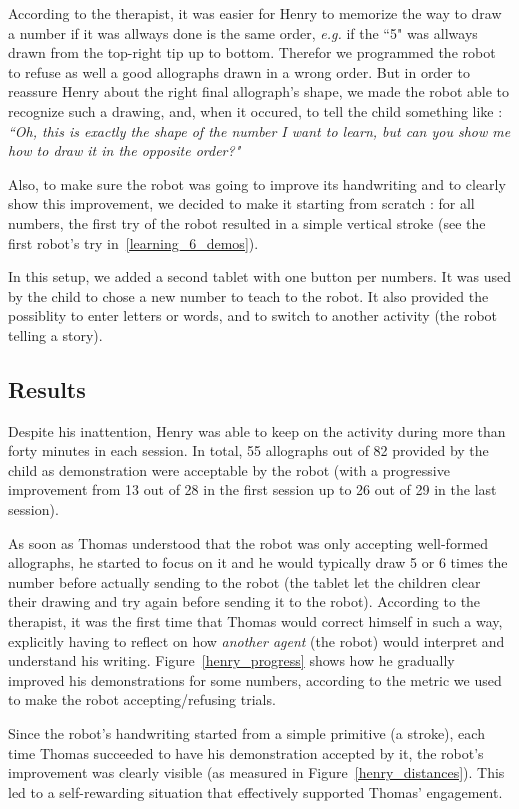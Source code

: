 \documentclass{sig-alternate}
\begin{document}
According to the therapist, it was easier for Henry to memorize the way to draw
a number if it was allways done is the same order, \emph{e.g.} if the ``5" was allways
drawn from the top-right tip up to bottom. Therefor we programmed the robot to
refuse as well a good allographs drawn in a wrong order. But in order to reassure Henry
about the right final allograph's shape, we made the robot able to recognize
such a drawing, and, when it occured, to tell the child something like :
\emph{``Oh, this is exactly the shape of the number I want to learn, but can you
show me how to draw it in the opposite order?"}

Also, to make sure the robot was going to improve its handwriting
and to clearly show this improvement, we decided to make it starting
from scratch : for all numbers, the first try of the robot resulted in
a simple vertical stroke (see the first robot's try
in~\ref{learning_6_demos}).

In this setup, we added a second tablet with one button per numbers. It was used
by the child to chose a new number to teach to the robot. It also provided the
possiblity to enter letters or words, and to switch to another activity (the
robot telling a story).


\subsection{Results}
Despite his inattention, Henry was able to keep on the activity during more than
forty minutes in each session. In total, 55 allographs out of 82 
provided by the child as demonstration were acceptable by the robot (with a
progressive improvement from 13 out of 28 in the first session up to 26 out
of 29 in the last session).

As soon as Thomas understood that the robot was only accepting well-formed
allographs, he started to focus on it and he would typically draw 5 or 6 times
the number before actually sending to the robot (the tablet let the children
clear their drawing and try again before sending it to the robot). According to
the therapist, it was the first time that Thomas would correct himself in such a
way, explicitly having to reflect on how \emph{another agent} (the robot) would
interpret and understand his writing. Figure~\ref{henry_progress} shows how
he gradually improved his demonstrations for some numbers, according to the
metric we used to make the robot accepting/refusing trials.

Since the robot's handwriting started from a simple primitive (a stroke), each
time Thomas succeeded to have his demonstration accepted by it, the robot's
improvement was clearly visible (as measured in Figure~\ref{henry_distances}).
This led to a self-rewarding situation that effectively supported Thomas'
engagement.
\end{document}
